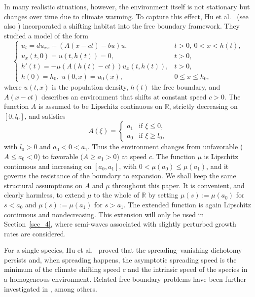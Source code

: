 \documentclass[reqno]{amsart}
\newcommand{\rev}[1]{#1}
\theoremstyle{plain}
\theoremstyle{definition}
\theoremstyle{remark}
\begin{document}
	In many realistic situations, however, the environment itself is not stationary but changes over time due to climate warming. To capture this effect, Hu et al.~\cite{HU20205931} (see also \cite{MR3871607,MR3639148}) incorporated a shifting habitat into the free boundary framework. They studied a model of the form
	\[
	\begin{cases}
		u_t = du_{xx} + (A(x - ct) - bu) u, & t > 0,~ 0 < x < h(t), \\
		u_x(t, 0) = u(t, h(t)) = 0, & t > 0, \\
		h'(t) = -\mu(A(h(t) - ct))u_x(t, h(t)), & t > 0, \\
		h(0) = h_0, \; u(0, x) = u_0(x), & 0 \leq x \leq h_0,
	\end{cases}
	\]
	where $u(t,x)$ is the population density, $h(t)$ the free boundary, and $A(x-ct)$ describes an environment that shifts at constant speed $c>0$. The function $A$ is assumed to be Lipschitz continuous on $\mathbb{R}$, strictly decreasing on $[0,l_0]$, and satisfies
	\[
	A(\xi) =
	\begin{cases}
		a_1 & \text{if } \xi \le 0, \\
		a_0 & \text{if } \xi \ge l_0,
	\end{cases}
	\]
	with $l_0 > 0$ and $a_0 < 0 < a_1$. Thus the environment changes from unfavorable ($A \le a_0<0$) to favorable ($A \ge a_1>0$) at speed $c$. The function $\mu$ is Lipschitz continuous and increasing on $[a_0,a_1]$, with $0<\mu(a_0)\le\mu(a_1)$, and it governs the resistance of the boundary to expansion. We shall keep the same structural assumptions on $A$ and $\mu$ throughout this paper. \rev{It is convenient, and clearly harmless, to extend $\mu$ to the whole of $\mathbb{R}$ by setting $\mu(s):=\mu(a_0)$ for $s<a_0$ and $\mu(s):=\mu(a_1)$ for $s>a_1$. The extended function is again Lipschitz continuous and nondecreasing. This extension will only be used in Section~\ref{sec_4}, where semi-waves associated with slightly perturbed growth rates are considered.}
	
	For a single species, Hu et al.~\cite{HU20205931} proved that the spreading–vanishing dichotomy persists and, when spreading happens, the asymptotic spreading speed is the minimum of the climate shifting speed $c$ and the intrinsic speed of the species in a homogeneous environment. Related free boundary problems have been further investigated in \cite{MR3764580,MR3691993,MR3377515,MR2471053,MR4404216,MR4873231,MR4766631}, among others.
	
\end{document}
